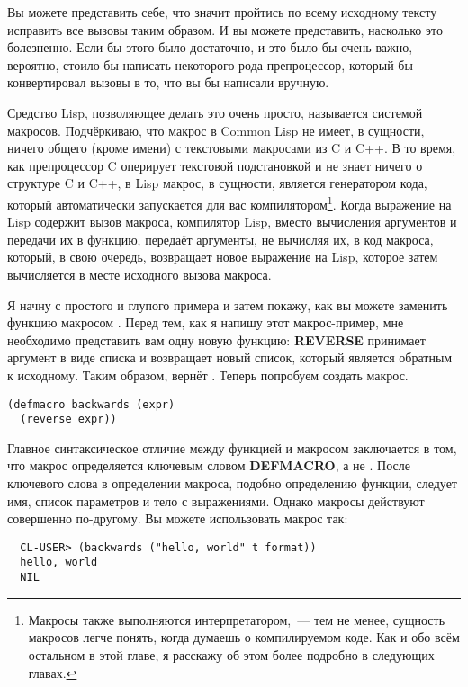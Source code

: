 Вы можете представить себе, что значит пройтись по всему исходному тексту исправить все
вызовы  таким образом. И вы можете представить, насколько это болезненно. Если
бы этого было достаточно, и это было бы очень важно, вероятно, стоило бы написать
некоторого рода препроцессор, который бы конвертировал вызовы  в то, что вы бы
написали вручную.

Средство Lisp, позволяющее делать это очень просто, называется системой
макросов. Подчёркиваю, что макрос в Common Lisp не имеет, в сущности, ничего общего (кроме
имени) с текстовыми макросами из C и C++. В то время, как препроцессор C оперирует
текстовой подстановкой и не знает ничего о структуре C и C++, в Lisp макрос, в сущности,
является генератором кода, который автоматически запускается для вас
компилятором\footnote{Макросы также выполняются интерпретатором,~--- тем не менее,
  сущность макросов легче понять, когда думаешь о компилируемом коде. Как и обо всём
  остальном в этой главе, я расскажу об этом более подробно в следующих главах.}. Когда
выражение на Lisp содержит вызов макроса, компилятор Lisp, вместо вычисления аргументов и
передачи их в функцию, передаёт аргументы, не вычисляя их, в код макроса, который, в свою
очередь, возвращает новое выражение на Lisp, которое затем вычисляется в месте исходного
вызова макроса.

Я начну с простого и глупого примера и затем покажу, как вы можете заменить функцию
 макросом . Перед тем, как я напишу этот макрос-пример, мне
необходимо представить вам одну новую функцию: \textbf{REVERSE} принимает аргумент в виде
списка и возвращает новый список, который является обратным к исходному. Таким образом,
 вернёт . Теперь попробуем создать макрос.

\begin{lstlisting}
(defmacro backwards (expr)
  (reverse expr))
\end{lstlisting}

Главное синтаксическое отличие между функцией и макросом заключается в том, что макрос
определяется ключевым словом \textbf{DEFMACRO}, а не . После ключевого слова в
определении макроса, подобно определению функции, следует имя, список параметров и тело с
выражениями. Однако макросы действуют совершенно по-другому. Вы можете использовать макрос
так:

\begin{verbatim}
  CL-USER> (backwards ("hello, world" t format))
  hello, world
  NIL
\end{verbatim}

